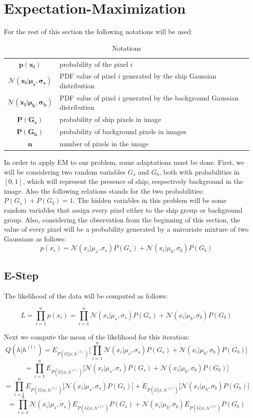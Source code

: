 \section{Expectation-Maximization}
For the rest of this section the following notations will be used:
\begin{table}[H]
	\centering
	\begin{tabular}{cp{}}
		$\mathbf{p(x_i)}$ & probability of the pixel $i$ \\ 
		$\mathbf{\mathcal{N} (x_i | \mu_s , \sigma_s)}$ & PDF value of pixel $i$ generated by the ship Gaussian distribution \\
		$\mathbf{\mathcal{N} (x_i | \mu_b , \sigma_b)}$ & PDF value of pixel $i$ generated by the background Gaussian distribution \\
		$\mathbf{P(G_s)}$ & probability of ship pixels in image\\
		$\mathbf{P(G_b)}$ & probability of background pixels in images\\
		$\mathbf{n}$ & number of pixels in the image 
	\end{tabular}
	\caption{Notations}\label{notations}
\end{table}
In order to apply EM to our problem, some adaptations must be done. First, we will be considering two random variables $G_s$ and $G_b$, both with probabilities in $[0, 1]$, which will represent the presence of ship, respectively background in the image. Also the following relations stands for the two probabilities: $P(G_s) + P(G_b) = 1$. The hidden variables in this problem will be some random variables that assign every pixel either to the ship group or background group. Also, considering the observation from the beginning of this section, the value of every pixel will be a probability generated by a univariate mixture of two Gaussians as follows:
$$ p(x_i) = \mathcal{N}(x_i | \mu_s, \sigma_s) P(G_s) + \mathcal{N}(x_i | \mu_b, \sigma_b) P(G_b) $$

\subsection{E-Step}

The likelihood of the data will be computed as follows:

$$L = \prod_{i=1}^{n} p(x_i) = \prod_{i=1}^{n} \mathcal{N}(x_i | \mu_s, \sigma_s) P(G_s) + \mathcal{N}(x_i | \mu_b, \sigma_b) P(G_b)$$

Next we compute the mean of the likelihood for this iteration:
$$Q(h | h^{(t)}) = E_{P(G | x, h^{(t)})}\bigg[\prod_{i=1}^{n} \mathcal{N}(x_i | \mu_s, \sigma_s) P(G_s) + \mathcal{N}(x_i | \mu_b, \sigma_b) P(G_b)\bigg]$$
$$=\prod_{i=1}^{n} E_{P(G | x, h^{(t)})}\bigg[\mathcal{N}(x_i | \mu_s, \sigma_s) P(G_s) + \mathcal{N}(x_i | \mu_b, \sigma_b) P(G_b)\bigg] $$
$$=\prod_{i=1}^{n}E_{P(G | x, h^{(t)})}\bigg[\mathcal{N}(x_i | \mu_s, \sigma_s) P(G_s)\bigg] + E_{P(G | x, h^{(t)})}\bigg[\mathcal{N}(x_i | \mu_b, \sigma_b) P(G_b)\bigg] $$
$$=\prod_{i=1}^{n} \mathcal{N}(x_i | \mu_s, \sigma_s) E_{P(G | x, h^{(t)})} P(G_s) + \mathcal{N}(x_i | \mu_b, \sigma_b) E_{P(G | x, h^{(t)})} P(G_b) $$

